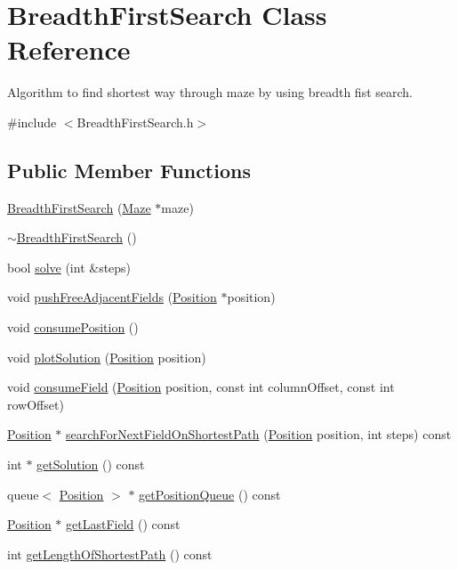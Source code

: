 \hypertarget{class_breadth_first_search}{\section{Breadth\-First\-Search Class Reference}
\label{class_breadth_first_search}
}


Algorithm to find shortest way through maze by using breadth fist search.  




{\ttfamily \#include $<$Breadth\-First\-Search.\-h$>$}

\subsection*{Public Member Functions}
\begin{DoxyCompactItemize}
\item 
\hyperlink{class_breadth_first_search_aa2eb988878d47abbb9a75de86dd3ccb6}{Breadth\-First\-Search} (\hyperlink{class_maze}{Maze} $\ast$maze)
\item 
\hyperlink{class_breadth_first_search_af56e60466779aa47b1b3c10a1a84d8ca}{$\sim$\-Breadth\-First\-Search} ()
\item 
bool \hyperlink{class_breadth_first_search_a0fccce0a839583c2e80eaacc1be8ed2e}{solve} (int \&steps)
\item 
void \hyperlink{class_breadth_first_search_a466d9907ad4223398e65c56743c887fe}{push\-Free\-Adjacent\-Fields} (\hyperlink{class_position}{Position} $\ast$position)
\item 
void \hyperlink{class_breadth_first_search_a71c86843e6fd1927280edbbb8fef9c23}{consume\-Position} ()
\item 
void \hyperlink{class_breadth_first_search_aff710f432b18251df00018f9a1603f19}{plot\-Solution} (\hyperlink{class_position}{Position} position)
\item 
void \hyperlink{class_breadth_first_search_a83527ad23d6f10bea0a91fe0aad1056d}{consume\-Field} (\hyperlink{class_position}{Position} position, const int column\-Offset, const int row\-Offset)
\item 
\hyperlink{class_position}{Position} $\ast$ \hyperlink{class_breadth_first_search_a31746f6d04a82b21a8c81a320fa61023}{search\-For\-Next\-Field\-On\-Shortest\-Path} (\hyperlink{class_position}{Position} position, int steps) const 
\item 
int $\ast$ \hyperlink{class_breadth_first_search_a5e5e17159bdda443af254af3f793b80f}{get\-Solution} () const 
\item 
queue$<$ \hyperlink{class_position}{Position} $>$ $\ast$ \hyperlink{class_breadth_first_search_af5345d1f260e617dc3d1d0636341a71c}{get\-Position\-Queue} () const 
\item 
\hyperlink{class_position}{Position} $\ast$ \hyperlink{class_breadth_first_search_a72d8df8632e4b6bc86afea0793025a48}{get\-Last\-Field} () const 
\item 
int \hyperlink{class_breadth_first_search_a36963ae576749a6aa36f2075f757b925}{get\-Length\-Of\-Shortest\-Path} () const 
\end{DoxyCompactItemize}
